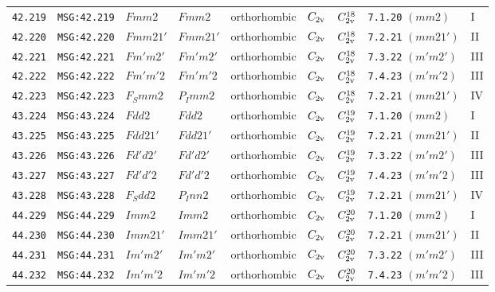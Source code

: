 \documentclass[fleqn,10pt]{jsarticle}
\begin{document}
\begin{center}
\begin{longtable}{lllllllll}
\texttt{42.219} & \texttt{MSG:42.219} & $Fmm2$ & $Fmm2$ & orthorhombic & $C_{\rm 2v}$ & $C_{\rm 2v}^{18}$ & \texttt{7.1.20} $(mm2)$ & I \\
\texttt{42.220} & \texttt{MSG:42.220} & $Fmm21'$ & $Fmm21'$ & orthorhombic & $C_{\rm 2v}$ & $C_{\rm 2v}^{18}$ & \texttt{7.2.21} $(mm21')$ & II \\
\texttt{42.221} & \texttt{MSG:42.221} & $Fm'm2'$ & $Fm'm2'$ & orthorhombic & $C_{\rm 2v}$ & $C_{\rm 2v}^{18}$ & \texttt{7.3.22} $(m'm2')$ & III \\
\texttt{42.222} & \texttt{MSG:42.222} & $Fm'm'2$ & $Fm'm'2$ & orthorhombic & $C_{\rm 2v}$ & $C_{\rm 2v}^{18}$ & \texttt{7.4.23} $(m'm'2)$ & III \\
\texttt{42.223} & \texttt{MSG:42.223} & $F_{S}mm2$ & $P_{I}mm2$ & orthorhombic & $C_{\rm 2v}$ & $C_{\rm 2v}^{18}$ & \texttt{7.2.21} $(mm21')$ & IV \\ \hline
\texttt{43.224} & \texttt{MSG:43.224} & $Fdd2$ & $Fdd2$ & orthorhombic & $C_{\rm 2v}$ & $C_{\rm 2v}^{19}$ & \texttt{7.1.20} $(mm2)$ & I \\
\texttt{43.225} & \texttt{MSG:43.225} & $Fdd21'$ & $Fdd21'$ & orthorhombic & $C_{\rm 2v}$ & $C_{\rm 2v}^{19}$ & \texttt{7.2.21} $(mm21')$ & II \\
\texttt{43.226} & \texttt{MSG:43.226} & $Fd'd2'$ & $Fd'd2'$ & orthorhombic & $C_{\rm 2v}$ & $C_{\rm 2v}^{19}$ & \texttt{7.3.22} $(m'm2')$ & III \\
\texttt{43.227} & \texttt{MSG:43.227} & $Fd'd'2$ & $Fd'd'2$ & orthorhombic & $C_{\rm 2v}$ & $C_{\rm 2v}^{19}$ & \texttt{7.4.23} $(m'm'2)$ & III \\
\texttt{43.228} & \texttt{MSG:43.228} & $F_{S}dd2$ & $P_{I}nn2$ & orthorhombic & $C_{\rm 2v}$ & $C_{\rm 2v}^{19}$ & \texttt{7.2.21} $(mm21')$ & IV \\ \hline
\texttt{44.229} & \texttt{MSG:44.229} & $Imm2$ & $Imm2$ & orthorhombic & $C_{\rm 2v}$ & $C_{\rm 2v}^{20}$ & \texttt{7.1.20} $(mm2)$ & I \\
\texttt{44.230} & \texttt{MSG:44.230} & $Imm21'$ & $Imm21'$ & orthorhombic & $C_{\rm 2v}$ & $C_{\rm 2v}^{20}$ & \texttt{7.2.21} $(mm21')$ & II \\
\texttt{44.231} & \texttt{MSG:44.231} & $Im'm2'$ & $Im'm2'$ & orthorhombic & $C_{\rm 2v}$ & $C_{\rm 2v}^{20}$ & \texttt{7.3.22} $(m'm2')$ & III \\
\texttt{44.232} & \texttt{MSG:44.232} & $Im'm'2$ & $Im'm'2$ & orthorhombic & $C_{\rm 2v}$ & $C_{\rm 2v}^{20}$ & \texttt{7.4.23} $(m'm'2)$ & III \\

\end{longtable}
\end{center}
\end{document}

